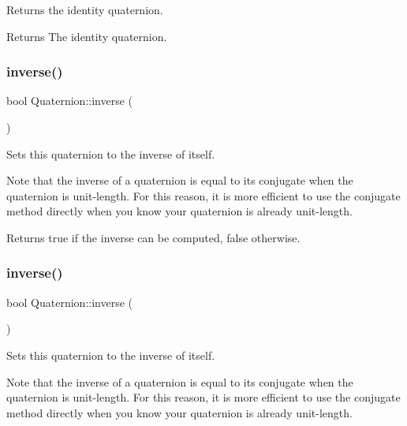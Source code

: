 Returns the identity quaternion.

\begin{DoxyReturn}{Returns}
The identity quaternion. 
\end{DoxyReturn}
\mbox{\label{classQuaternion_aabe14be8bd8676241317449595cdcfff}} 
\subsubsection{\texorpdfstring{inverse()}{inverse()}\hspace{0.1cm}{\footnotesize\ttfamily [1/2]}}
{\footnotesize\ttfamily bool Quaternion\+::inverse (\begin{DoxyParamCaption}{ }\end{DoxyParamCaption})}

Sets this quaternion to the inverse of itself.

Note that the inverse of a quaternion is equal to its conjugate when the quaternion is unit-\/length. For this reason, it is more efficient to use the conjugate method directly when you know your quaternion is already unit-\/length.

\begin{DoxyReturn}{Returns}
true if the inverse can be computed, false otherwise. 
\end{DoxyReturn}
\mbox{\label{classQuaternion_aabe14be8bd8676241317449595cdcfff}} 
\subsubsection{\texorpdfstring{inverse()}{inverse()}\hspace{0.1cm}{\footnotesize\ttfamily [2/2]}}
{\footnotesize\ttfamily bool Quaternion\+::inverse (\begin{DoxyParamCaption}{ }\end{DoxyParamCaption})}

Sets this quaternion to the inverse of itself.

Note that the inverse of a quaternion is equal to its conjugate when the quaternion is unit-\/length. For this reason, it is more efficient to use the conjugate method directly when you know your quaternion is already unit-\/length.

